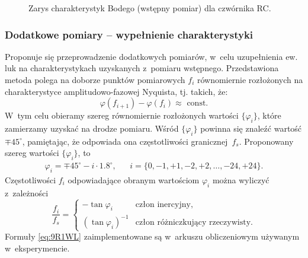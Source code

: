 \documentclass[paper=a4,DIV=12]{lpas}
\newcommand{\degree}{^{\circ}}
\begin{document}
\begin{appendices}
  \begin{figure}[H]
    \centering
    
    \caption{Zarys charakterystyk Bodego (wstępny pomiar) dla czwórnika RC.}
    \label{fig:UIR99}
  \end{figure}

  \subsubsection{Dodatkowe pomiary -- wypełnienie charakterystyki}
  \label{sec:2C7WK}

  Proponuje się przeprowadzenie dodatkowych pomiarów, w~celu uzupełnienia ew. luk
  na charakterystykach uzyskanych z~pomiaru wstępnego. Przedstawiona metoda
  polega na doborze punktów pomiarowych $f_i$ równomiernie rozłożonych na
  charakterystyce amplitudowo-fazowej Nyquista, tj. takich, że:
  \begin{equation}
    \varphi(f_{i+1}) - \varphi(f_i) \approx \text{ const}.
    \label{eq:BMOQL}
  \end{equation}
  W~tym celu obieramy szereg równomiernie rozłożonych wartości $\{\varphi_i\}$,
  które zamierzamy uzyskać na drodze pomiaru. Wśród $\{\varphi_i\}$ powinna się
  znaleźć wartość $\mp 45\degree$, pamiętając, że odpowiada ona
  częstotliwości granicznej~$f_s$. Proponowany szereg wartości $\{\varphi_i\}$, to
  \begin{equation}
    \begin{aligned}
      & \varphi_i = \mp 45\degree - i \cdot 1.8\degree, && i=\{0, -1,+1,-2,+2,\dots,-24,+24\}. &
    \end{aligned}
    \label{eq:0ZBDF}
  \end{equation}
  Częstotliwości $f_i$ odpowiadające obranym wartościom $\varphi_i$ można wyliczyć
  z~zależności
  \begin{equation}
    \frac{f_i}{f_s} = \begin{cases}
      - \tan{\varphi_i} & \text{człon inercyjny}, \\
      (\tan{\varphi_i})^{-1} & \text{człon różniczkujący rzeczywisty}.
    \end{cases}
    \label{eq:9R1WL}
  \end{equation}
  Formuły \eqref{eq:9R1WL} zaimplementowane są w~arkuszu obliczeniowym używanym
  w~eksperymencie.


\end{appendices}
\end{document}
